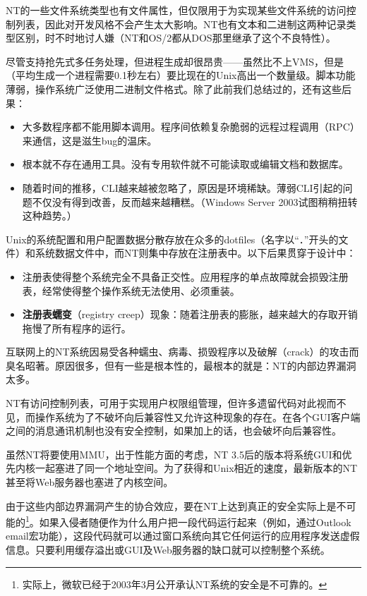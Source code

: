 \documentclass[12pt,oneside]{book}
\begin{document}
NT的一些文件系统类型也有文件属性，但仅限用于为实现某些文件系统的访问控制列表，因此对开发风格不会产生太大影响。NT也有文本和二进制这两种记录类型区别，时不时地讨人嫌（NT和OS/2都从DOS那里继承了这个不良特性）。

尽管支持抢先式多任务处理，但进程生成却很昂贵——虽然比不上VMS，但是（平均生成一个进程需要0.1秒左右）要比现在的Unix高出一个数量级。脚本功能薄弱，操作系统广泛使用二进制文件格式。除了此前我们总结过的，还有这些后果：

\begin{itemize}
\item 大多数程序都不能用脚本调用。程序间依赖复杂脆弱的远程过程调用（RPC）来通信，这是滋生bug的温床。
\item 根本就不存在通用工具。没有专用软件就不可能读取或编辑文档和数据库。
\item 随着时间的推移，CLI越来越被忽略了，原因是环境稀缺。薄弱CLI引起的问题不仅没有得到改善，反而越来越糟糕。（Windows Server 2003试图稍稍扭转这种趋势。）
\end{itemize}

Unix的系统配置和用户配置数据分散存放在众多的dotfiles（名字以“．”开头的文件）和系统数据文件中，而NT则集中存放在注册表中。以下后果贯穿于设计中：

\begin{itemize}
\item 注册表使得整个系统完全不具备正交性。应用程序的单点故障就会损毁注册表，经常使得整个操作系统无法使用、必须重装。
\item \textbf{注册表蠕变}（registry creep）现象：随着注册表的膨胀，越来越大的存取开销拖慢了所有程序的运行。
\end{itemize}

互联网上的NT系统因易受各种蠕虫、病毒、损毁程序以及破解（crack）的攻击而臭名昭著。原因很多，但有一些是根本性的，最根本的就是：NT的内部边界漏洞太多。

NT有访问控制列表，可用于实现用户权限组管理，但许多遗留代码对此视而不见，而操作系统为了不破坏向后兼容性又允许这种现象的存在。在各个GUI客户端之间的消息通讯机制也没有安全控制，如果加上的话，也会破坏向后兼容性。

虽然NT将要使用MMU，出于性能方面的考虑，NT 3.5后的版本将系统GUI和优先内核一起塞进了同一个地址空间。为了获得和Unix相近的速度，最新版本的NT甚至将Web服务器也塞进了内核空间。

由于这些内部边界漏洞产生的协合效应，要在NT上达到真正的安全实际上是不可能的\footnote{实际上，微软已经于2003年3月公开承认NT系统的安全是不可靠的。}。如果入侵者随便作为什么用户把一段代码运行起来（例如，通过Outlook email宏功能），这段代码就可以通过窗口系统向其它任何运行的应用程序发送虚假信息。只要利用缓存溢出或GUI及Web服务器的缺口就可以控制整个系统。
\end{document}
